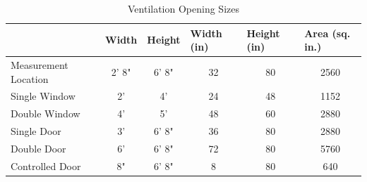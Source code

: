 \documentclass{article}
\begin{document}
\begin{table}[!ht]
\centering
\caption{Ventilation Opening Sizes}\label{Vent_Sizes}
\begin{tabular}{lccccc}
\toprule[1.5pt]
\multicolumn{1}{l}{} & \multicolumn{1}{l}{\textbf{Width}} & \multicolumn{1}{l}{\textbf{Height}} & \multicolumn{1}{l}{\textbf{Width (in)}} & \multicolumn{1}{l}{\textbf{Height (in)}} & \multicolumn{1}{l}{\textbf{Area (sq. in.)}} \\ 
\midrule
\multicolumn{1}{l}{Measurement Location} & 2' 8" & 6' 8" & 32 & \multicolumn{1}{c}{80} & 2560 \\
\multicolumn{1}{l}{Single Window} & 2' & 4' & 24 & \multicolumn{1}{c}{48} & 1152 \\
\multicolumn{1}{l}{Double Window} & 4' & 5' & 48 & \multicolumn{1}{c}{60} & 2880 \\
\multicolumn{1}{l}{Single Door} & 3' & 6' 8" & 36 & \multicolumn{1}{c}{80} & 2880 \\
\multicolumn{1}{l}{Double Door} & 6' & 6' 8" & 72 & \multicolumn{1}{c}{80} & 5760 \\
\multicolumn{1}{l}{Controlled Door} & 8" & 6' 8" & 8 & \multicolumn{1}{c}{80} & 640 \\ 
\bottomrule[1.25pt]
\end{tabular}
\end{table}


\end{document}

